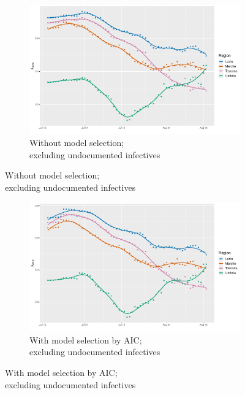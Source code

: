 \documentclass[12pt]{article}
\begin{document}
\begin{appendices}
		\begin{figure}[H]
    	    \centering
    	    \begin{subfigure}{\textwidth}
    	      \centering
    	      \includegraphics[width=0.94\linewidth]{output/model_within_lag14_betawithin_Centro (IT)_rolling.pdf}
    	      \caption{Without model selection; \\ excluding undocumented infectives}
    	      \label{fig:beta_within_over_time_centro_regular}
    	    \end{subfigure}\newline
        \end{figure}
        \begin{figure}[H]\ContinuedFloat
    	    \begin{subfigure}{\textwidth}
    	      \centering
    	      \includegraphics[width=0.94\linewidth]{output/model_within_lag14_betawithin_Centro (IT)_aic_rolling.pdf}
    	      \caption{With model selection by AIC; \\ excluding undocumented infectives}
    	      \label{fig:beta_within_over_time_centro_aic}
    	    \end{subfigure}

\end{figure}
\end{appendices}
\end{document}
